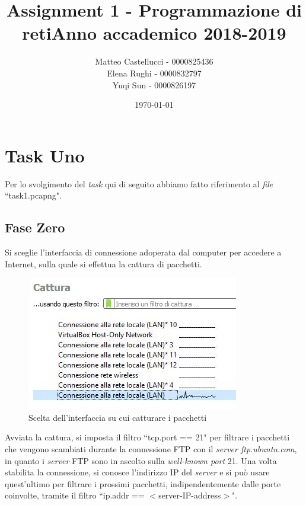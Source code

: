 \documentclass[a4paper, 12pt]{report}
\title{Assignment 1 - Programmazione di reti\newline Anno accademico 2018-2019}
\date{\today}
\author{Matteo Castellucci - 0000825436\\Elena Rughi - 0000832797\\Yuqi Sun - 0000826197\newline}
\begin{document}
\maketitle

\tableofcontents

\chapter{Task Uno}

Per lo svolgimento del \textit{task} qui di seguito abbiamo fatto riferimento al \textit{file} ``task1.pcapng".

\section{Fase Zero}

Si sceglie l’interfaccia di connessione adoperata dal computer per accedere a Internet, sulla quale si effettua la cattura di pacchetti.

\begin{figure}[H]
	\centering
	\includegraphics[width=\linewidth]{images/image1_1.png}
	\caption{Scelta dell'interfaccia su cui catturare i pacchetti}
\end{figure}

Avviata la cattura, si imposta il filtro ``tcp.port == 21" per filtrare i pacchetti che vengono scambiati durante la connessione FTP con il \textit{server ftp.ubuntu.com}, in quanto i 
\textit{server} FTP sono in ascolto sulla \textit{well-known port} 21. Una volta stabilita la connessione, si conosce l’indirizzo IP del \textit{server} e si può usare quest’ultimo per
filtrare i prossimi pacchetti, indipendentemente dalle porte coinvolte, tramite il filtro ``ip.addr == $<$server-IP-address$>$".
 
\end{document}
